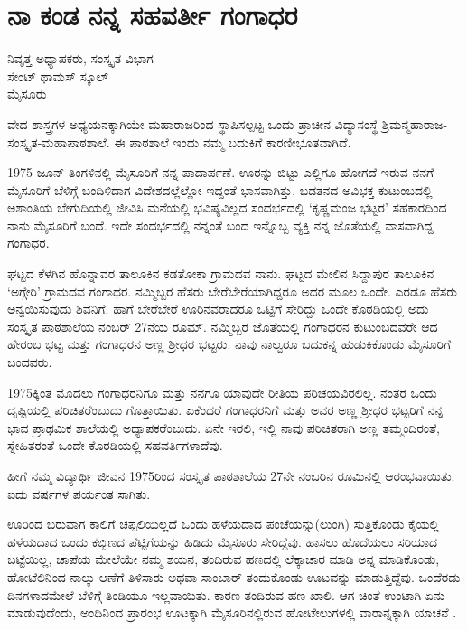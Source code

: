 {\fontsize{14}{16}\selectfont
\chapter{ನಾ ಕಂಡ ನನ್ನ ಸಹವರ್ತೀ ಗಂಗಾಧರ}

\begin{center}

ನಿವೃತ್ತ ಅಧ್ಯಾಪಕರು, ಸಂಸ್ಕೃತ ವಿಭಾಗ\\
ಸೇಂಟ್ ಥಾಮಸ್ ಸ್ಕೂಲ್\\
ಮೈಸೂರು
\addrule
\end{center}

ವೇದ \enginline{-}ಶಾಸ್ತ್ರಗಳ ಅಧ್ಯಯನಕ್ಕಾಗಿಯೇ ಮಹಾರಾಜರಿಂದ ಸ್ಥಾಪಿಸಲ್ಪಟ್ಟ ಒಂದು ಪ್ರಾಚೀನ ವಿದ್ಯಾಸಂಸ್ಥೆ   ಶ್ರಿಮನ್ಮಹಾರಾಜ-ಸಂಸ್ಕೃತ-ಮಹಾಪಾಠಶಾಲೆ. ಈ ಪಾಠಶಾಲೆ ಇಂದು ನಮ್ಮ ಬದುಕಿಗೆ ಕಾರಣೀಭೂತವಾಗಿದೆ. 
\vskip 3pt

1975 ಜೂನ್ ತಿಂಗಳಿನಲ್ಲಿ ಮೈಸೂರಿಗೆ ನನ್ನ ಪಾದಾರ್ಪಣೆ. ಊರನ್ನು ಬಿಟ್ಟು ಎಲ್ಲಿಗೂ ಹೋಗದೆ ಇರುವ ನನಗೆ ಮೈಸೂರಿಗೆ ಬೆಳಿಗ್ಗೆ  ಬಂದಿಳಿದಾಗ  ವಿದೇಶದಲ್ಲೆಲ್ಲೋ ಇದ್ದಂತೆ ಭಾಸವಾಗಿತ್ತು. ಬಡತನದ ಅವಿಭಕ್ತ ಕುಟುಂಬದಲ್ಲಿ  ಅಶಾಂತಿಯ ಬೇಗುದಿಯಲ್ಲಿ ಜೀವಿಸಿ ಮನೆಯಲ್ಲಿ ಭವಿಷ್ಯವಿಲ್ಲದ ಸಂದರ್ಭದಲ್ಲಿ ‘ಕೃಷ್ಣಮಂಜ ಭಟ್ಟರ’ ಸಹಕಾರದಿಂದ ನಾನು ಮೈಸೂರಿಗೆ ಬಂದೆ. ಇದೇ ಸಂದರ್ಭದಲ್ಲಿ ನನ್ನಂತೆ  ಬಂದ ಇನ್ನೊಬ್ಬ ವ್ಯಕ್ತಿ ನನ್ನ ಜೊತೆಯಲ್ಲಿ ವಾಸವಾಗಿದ್ದ ಗಂಗಾಧರ.
\vskip 3pt

ಘಟ್ಟದ ಕೆಳಗಿನ ಹೊನ್ನಾವರ ತಾಲೂಕಿನ ಕಡತೋಕಾ ಗ್ರಾಮದವ ನಾನು. ಘಟ್ಟದ ಮೇಲಿನ ಸಿದ್ದಾಪುರ ತಾಲೂಕಿನ ‘ಅಗ್ಗೇರಿ’ ಗ್ರಾಮದವ ಗಂಗಾಧರ. ನಮ್ಮಿಬ್ಬರ ಹೆಸರು ಬೇರೆ\enginline{-}ಬೇರೆಯಾಗಿದ್ದರೂ ಅದರ ಮೂಲ ಒಂದೇ. ಎರಡೂ ಹೆಸರು   ಅನ್ವಯಿಸುವುದು ಶಿವನಿಗೆ. ಹಾಗೆ ಬೇರೆ\enginline{-}ಬೇರೆ  ಊರಿನವರಾದರೂ ಒಟ್ಟಿಗೆ ಸೇರಿದ್ದು ಒಂದೇ ಕೊಠಡಿ\-ಯಲ್ಲಿ ಅದು ಸಂಸ್ಕೃತ ಪಾಠಶಾಲೆಯ  ನಂಬರ್ 27ನೆಯ ರೂಮ್. ನಮ್ಮಿಬ್ಬರ ಜೊತೆಯಲ್ಲಿ ಗಂಗಾಧರನ ಕುಟುಂಬದವರೇ ಆದ ಹೇರಂಬ ಭಟ್ಟ ಮತ್ತು ಗಂಗಾಧರನ ಅಣ್ಣ ಶ್ರೀಧರ ಭಟ್ಟರು. ನಾವು ನಾಲ್ವರೂ ಬದುಕನ್ನ ಹುಡುಕಿಕೊಂಡು ಮೈಸೂರಿಗೆ ಬಂದವರು. 

1975ಕ್ಕಿಂತ  ಮೊದಲು ಗಂಗಾಧರನಿಗೂ ಮತ್ತು ನನಗೂ ಯಾವುದೇ ರೀತಿಯ ಪರಿಚಯ\-ವಿರಲಿಲ್ಲ. ನಂತರ ಒಂದು ದೃಷ್ಟಿಯಲ್ಲಿ ಪರಿಚಿತರೆಂಬುದು ಗೊತ್ತಾಯಿತು. ಏಕೆಂದರೆ  ಗಂಗಾಧರನಿಗೆ ಮತ್ತು ಅವರ ಅಣ್ಣ ಶ್ರೀಧರ ಭಟ್ಟರಿಗೆ  ನನ್ನ ಭಾವ \hbox{ಪ್ರಾಥಮಿಕ} ಶಾಲೆಯಲ್ಲಿ ಅಧ್ಯಾಪಕರೆಂಬುದು. ಏನೇ ಇರಲಿ, ಇಲ್ಲಿ ನಾವು ಪರಿಚಿತರಾಗಿ ಅಣ್ಣ \enginline{-} ತಮ್ಮಂದಿರಂತೆ, ಸ್ನೇಹಿತರಂತೆ ಒಂದೇ ಕೊಠಡಿಯಲ್ಲಿ ಸಹವರ್ತಿಗಳಾದೆವು. 

ಹೀಗೆ ನಮ್ಮ ವಿದ್ಯಾರ್ಥಿ ಜೀವನ 1975ರಿಂದ ಸಂಸ್ಕೃತ ಪಾಠಶಾಲೆಯ 27ನೇ \hbox{ನಂಬರಿನ} ರೂಮಿನಲ್ಲಿ ಆರಂಭವಾಯಿತು. ಐದು ವರ್ಷಗಳ ಪರ್ಯಂತ  ಸಾಗಿತು. 

ಊರಿಂದ ಬರುವಾಗ ಕಾಲಿಗೆ ಚಪ್ಪಲಿಯಿಲ್ಲದೆ ಒಂದು ಹಳೆಯದಾದ ಪಂಚೆ\-ಯನ್ನು(ಲುಂಗಿ) ಸುತ್ತಿಕೊಂಡು ಕೈಯಲ್ಲಿ ಹಳೆಯದಾದ ಒಂದು ಕಬ್ಬಿಣದ ಪೆಟ್ಟಿಗೆಯನ್ನು ಹಿಡಿದು ಮೈಸೂರು ಸೇರಿದ್ದೆವು. ಹಾಸಲು  \enginline{-}   ಹೊದೆಯಲು ಸರಿಯಾದ ಬಟ್ಟೆ\-ಯಿಲ್ಲ, ಚಾಪೆಯ ಮೇಲೆಯೇ ನಮ್ಮ ಶಯನ, ತಂದಿರುವ ಹಣದಲ್ಲಿ ಲೆಕ್ಕಾಚಾರ ಮಾಡಿ ಅನ್ನ ಮಾಡಿಕೊಂಡು, ಹೋಟೆಲಿನಿಂದ ನಾಲ್ಕು ಆಣೆಗೆ ತಿಳಿಸಾರು  ಅಥವಾ ಸಾಂಬಾರ್ ತಂದುಕೊಂಡು ಊಟವನ್ನು ಮಾಡುತ್ತಿದ್ದೆವು. ಒಂದೆರಡು ದಿನಗಳಾದಮೇಲೆ  ಬೆಳಿಗ್ಗೆ ತಿಂಡಿಯೂ ಇಲ್ಲವಾಯಿತು. ಕಾರಣ ತಂದಿರುವ ಹಣ ಖಾಲಿ. ಆಗ ಚಿಂತೆ ಉಂಟಾಗಿ ಏನು ಮಾಡುವುದೆಂದು, ಅಂದಿನಿಂದ ಪ್ರಾರಂಭ  \enginline{-} ಊಟಕ್ಕಾಗಿ ಮೈಸೂರಿನಲ್ಲಿರುವ ಹೋಟೇಲುಗಳಲ್ಲಿ ವಾರಾನ್ನಕ್ಕಾಗಿ ಯಾಚನೆ .

}
